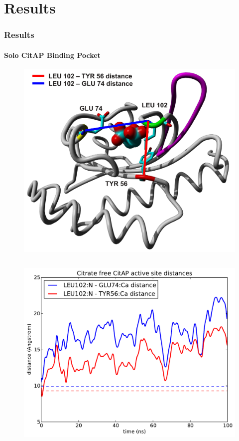 \documentclass[english]{beamer}
\begin{document}

\section{Results}

\begin{frame}
    \frametitle{Results}
    \framesubtitle{Solo CitAP Binding Pocket}

    \vspace{1.0\topmargin}

    \begin{figure}
        \hspace{0.2\textwidth}
        \includegraphics[width=.4\linewidth]{figures/CitA_pocket2.pdf}
    \end{figure}     

    \vspace{-1.2cm}

    \begin{columns}[t]
        \begin{figure}
            \includegraphics[width=1.0\textwidth]{figures/CitAP_opening/CitAP_dist_free.pdf}
        \end{figure}       


\end{columns}
\end{frame}
\end{document}
